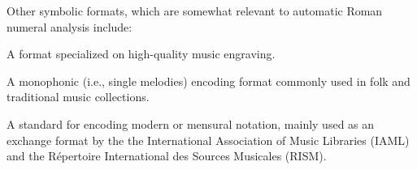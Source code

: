 

Other symbolic formats, which are somewhat relevant to automatic Roman numeral analysis include:


A format specialized on high-quality music engraving.


A monophonic (i.e., single melodies) encoding format commonly used in folk and traditional music collections.


A standard for encoding modern or mensural notation, mainly used as an exchange format by the the International Association of Music Libraries (IAML) and the R\'epertoire International des Sources Musicales (RISM).
